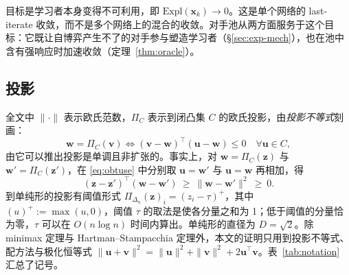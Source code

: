 \documentclass{article}
\theoremstyle{plain}
\theoremstyle{remark}
\newcommand{\Expl}{\mathrm{Expl}}
\newcommand{\Proj}{\Pi}
\newcommand{\simplex}{\Delta}
\newcommand{\bx}{{\bm{x}}}
\newcommand{\bv}{{\bm{v}}}
\newcommand{\bw}{{\bm{w}}}
\newcommand{\bz}{{\bm{z}}}
\newcommand{\bu}{{\bm{u}}}
\begin{document}
目标是学习者本身变得不可利用，即 $\Expl(\bx_k)\to0$。这是单个网络的 last-iterate 收敛，而不是多个网络上的混合的收敛。对手池从两方面服务于这个目标：它既让自博弈产生不了的对手参与塑造学习者（\S\ref{sec:exp-mech}），也在池中含有强响应时加速收敛（定理~\ref{thm:oracle}）。

\subsection{投影}

全文中 $\|\cdot\|$ 表示欧氏范数，$\Proj_C$ 表示到闭凸集 $C$ 的欧氏投影，由\emph{投影不等式}刻画：
\begin{equation}
\bw=\Proj_C(\bv)\iff(\bv-\bw)^\top(\bu-\bw)\le0\quad\forall \bu\in C ,
\label{eq:obtuse}
\end{equation}
由它可以推出投影是单调且非扩张的\citep{bauschke2011convex}。事实上，对 $\bw=\Proj_C(\bz)$ 与 $\bw'=\Proj_C(\bz')$，在 \eqref{eq:obtuse} 中分别取 $\bu=\bw'$ 与 $\bu=\bw$ 再相加，得
\begin{equation}
(\bz-\bz')^\top(\bw-\bw')\ \ge\ \|\bw-\bw'\|^2\ \ge\ 0 .
\label{eq:monotone}
\end{equation}
到单纯形的投影有阈值形式 $\Proj_{\simplex_n}(\bz)_i=(z_i-\tau)^+$，其中 $(u)^+:=\max(u,0)$，阈值 $\tau$ 的取法是使各分量之和为 1；低于阈值的分量恰为零，$\tau$ 可以在 $O(n\log n)$ 时间内算出\citep{duchi2008projection}。单纯形的直径为 $D=\sqrt2$。除 minimax 定理与 Hartman--Stampacchia 定理外，本文的证明只用到投影不等式、配方法与极化恒等式 $\|\bu+\bv\|^2=\|\bu\|^2+\|\bv\|^2+2\bu^\top\bv$。表~\ref{tab:notation} 汇总了记号。
\end{document}
